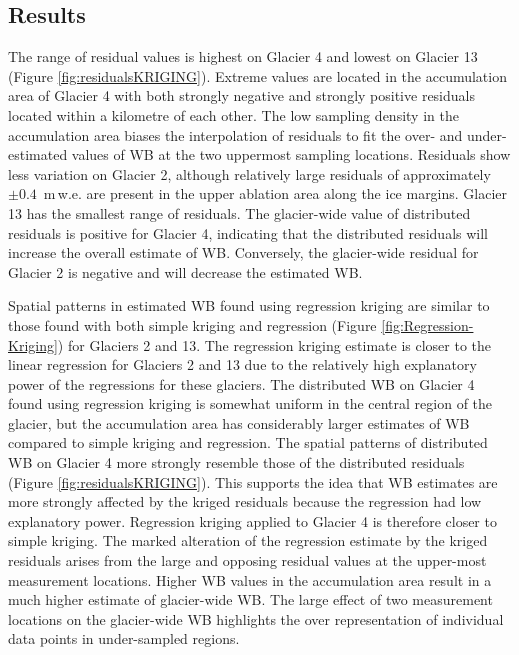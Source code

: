 \documentclass{sfuthesis}
\begin{document}
\subsection{Results}

The range of residual values is highest on Glacier 4 and lowest on Glacier 13 (Figure \ref{fig:residualsKRIGING}). Extreme values are located in the accumulation area of Glacier 4 with both strongly negative and strongly positive residuals located within a kilometre of each other. The low sampling density in the accumulation area biases the interpolation of residuals to fit the over- and under-estimated values of WB at the two uppermost sampling locations. Residuals show less variation on Glacier 2, although relatively large residuals of approximately $\pm 0.4$ \,m\,w.e. are present in the upper ablation area along the ice margins. Glacier 13 has the smallest range of residuals. The glacier-wide value of distributed residuals is positive for Glacier 4, indicating that the distributed residuals will increase the overall estimate of WB. Conversely, the glacier-wide residual for Glacier 2 is negative and will decrease the estimated WB. 

Spatial patterns in estimated WB found using regression kriging are similar to those found with both simple kriging and regression (Figure \ref{fig:Regression-Kriging}) for Glaciers 2 and 13. The regression kriging estimate is closer to the linear regression for Glaciers 2 and 13 due to the relatively high explanatory power of the regressions for these glaciers. The distributed WB on Glacier 4 found using regression kriging is somewhat uniform in the central region of the glacier, but the accumulation area has considerably larger estimates of WB compared to simple kriging and regression. The spatial patterns of distributed WB on Glacier 4 more strongly resemble those of the distributed residuals (Figure \ref{fig:residualsKRIGING}). This supports the idea that WB estimates are more strongly affected by the kriged residuals because the regression had low explanatory power. Regression kriging applied to Glacier 4 is therefore closer to simple kriging. The marked alteration of the regression estimate by the kriged residuals arises from the large and opposing residual values at the upper-most measurement locations. Higher WB values in the accumulation area result in a much higher estimate of glacier-wide WB. The large effect of two measurement locations on the glacier-wide WB highlights the over representation of individual data points in under-sampled regions.
\end{document}
